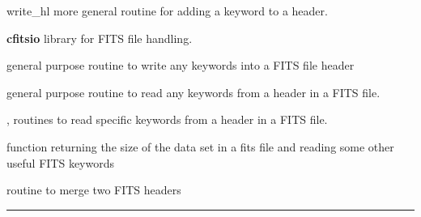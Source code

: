 \begin{modules}
  \begin{sulist}{} %
  \item[write\_hl] more general routine for adding a keyword to a header.
  \item[\textbf{cfitsio}] library for FITS file handling.		
  \end{sulist}
\end{modules}

\begin{related}
  \begin{sulist}{} %
  \item[\htmlref{add\_card}{sub:add_card}] general purpose routine to write any keywords into a FITS
  file header
  \item[\htmlref{get\_card}{sub:get_card}] general purpose routine to read any keywords from a header in a FITS file.
  \item[\htmlref{read\_par}{sub:read_par}, \htmlref{number\_of\_alms}{sub:number_of_alms}] routines to read specific keywords from a
  header in a FITS file.
  \item[\htmlref{getsize\_fits}{sub:getsize_fits}] function returning the size of the data set in a fits
  file and reading some other useful FITS keywords
  \item[\htmlref{merge\_headers}{sub:merge_headers}] routine to merge two FITS headers
  \end{sulist}
\end{related}

\rule{\hsize}{2mm}

\newpage
